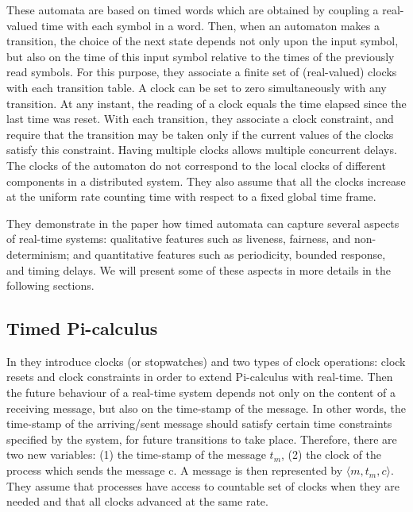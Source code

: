 \documentclass[a4paper,11pt,twoside]{report}
\begin{document}
These automata are based on timed words which are obtained by coupling a real-valued time with each symbol in a word. Then, when an automaton makes a transition, the choice of the next state depends not only upon the input symbol, but also on the time of this input symbol relative to the times of the previously read symbols. For this purpose, they associate a finite set of (real-valued) clocks with each transition table. A clock can be set to zero simultaneously with any transition. At any instant, the reading of a clock equals the time elapsed since the last time was reset. With each transition, they associate a clock constraint, and require that the transition may be taken only if the current values of the clocks satisfy this constraint. Having multiple clocks allows multiple concurrent delays. The clocks of the automaton do not correspond to the local clocks of different components in a distributed system. They also assume that all the clocks increase at the uniform rate counting time with respect to a fixed global time frame.

They demonstrate in the paper how timed automata can capture several aspects of real-time systems: qualitative features such as liveness, fairness, and non-determinism; and quantitative features such as periodicity, bounded response, and timing delays. We will present some of these aspects in more details in the following sections.


\subsection{Timed Pi-calculus}
In \cite{saeedloei2008timed} they introduce clocks (or stopwatches) and two types of clock operations: clock resets and clock constraints in order to extend Pi-calculus with real-time. Then the future behaviour of a real-time system depends not only on the content of a receiving message, but also on the time-stamp of the message. In other words, the time-stamp of the arriving/sent message should satisfy certain time constraints specified by the system, for future transitions to take place. Therefore, there are two new variables: (1) the time-stamp of the message $t_{m}$, (2) the clock of the process which sends the message c. A message is then represented by $\langle m, t_{m}, c \rangle$. They assume that processes have access to countable set of clocks when they are needed and that all clocks advanced at the same rate.
\end{document}
